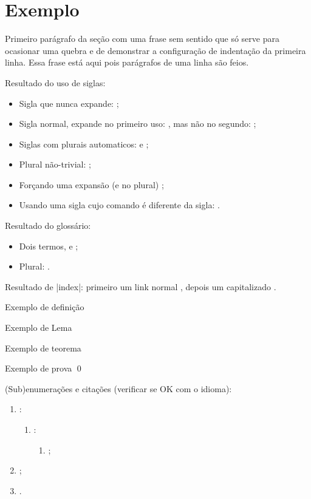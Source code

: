 
\chapter{Exemplo}
\label{ch:exemplo}

 Primeiro parágrafo da seção com uma frase sem sentido que só serve para ocasionar uma quebra e de demonstrar a configuração de indentação da primeira linha. Essa frase está aqui pois parágrafos de uma linha são feios.

Resultado do uso de siglas:
\begin{itemize}
\item Sigla que nunca expande: \API;
\item Sigla normal, expande no primeiro uso: \DHT, mas não no segundo: \DHT;
\item Siglas com plurais automaticos: \APIs e \DHTs;
\item Plural não-trivial: \SQs;
\item Forçando uma expansão (e no plural) ;
\item Usando uma sigla cujo comando é diferente da sigla: \WTC.
\end{itemize}

Resultado do glossário:
\begin{itemize}
\item Dois termos, \polling e \proxy;
\item Plural: \proxys.
\end{itemize}

Resultado de \mla|index|: primeiro um link normal , depois um capitalizado .

\begin{defn}
  Exemplo de definição
\end{defn}

\begin{lemma}
  Exemplo de Lema
\end{lemma}

\begin{theorem}
  Exemplo de teorema
\end{theorem}

\begin{theoremproof}
  Exemplo de prova \qed
\end{theoremproof}

(Sub)enumerações e citações (verificar se OK com o idioma):
\begin{enumerate}
\item \cite{turing1937}:
  \begin{enumerate}
  \item {}:
    \begin{enumerate}
    \item {};
    \end{enumerate}
  \end{enumerate}
\item \cite{turing1937,dijkstra1968};
\item {}.
\end{enumerate}


